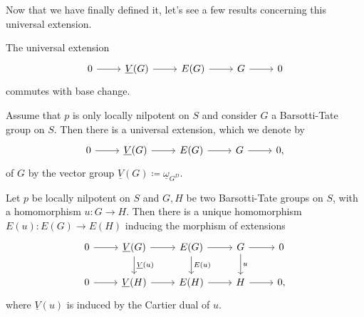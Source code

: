 \noindent
Now that we have finally defined it, let's see
a few results concerning this universal extension.


\begin{lem}
	The universal extension 
	\begin{equation*}
	\begin{tikzcd}
		0 \arrow[r, "", rightarrow] &
		\underline{V}(G) \arrow[r, "", rightarrow] &
		E(G) \arrow[r, "", rightarrow] &
		G \arrow[r, "", rightarrow] &
		0
	\end{tikzcd}
	\end{equation*}
	commutes with base change.
\end{lem} 


\begin{lem}
	Assume that $p$ is only locally nilpotent on $S$
	and consider $G$ a Barsotti-Tate group on $S$.
	Then there is a universal extension, which we denote by
	\begin{equation*}
	\begin{tikzcd}
		0 \arrow[r, "", rightarrow] &
		\underline{V}(G) \arrow[r, "", rightarrow] &
		E(G) \arrow[r, "", rightarrow] &
		G \arrow[r, "", rightarrow] &
		0
	,\end{tikzcd}
	\end{equation*}
	of $G$ by the vector group
	$\underline{V}(G) \coloneqq \underline{\omega}_{G^D}$.
\end{lem} 


\begin{prop}\label{prop:MorUnivExts}
	Let $p$ be locally nilpotent on $S$ and $G,H$ be two
	Barsotti-Tate groups on $S$, with a homomorphism $u\colon G \to H$.
	Then there is a unique homomorphism
	$E(u)\colon E(G) \to E(H)$ inducing the morphism of extensions
	\begin{equation*}
	\begin{tikzcd}
		0 \arrow[r, "", rightarrow] &
		\underline{V}(G) \arrow[r, "", rightarrow] 
		\arrow[d, "\underline{V}(u)", rightarrow] &
		E(G) \arrow[r, "", rightarrow] 
		\arrow[d, "E(u)", rightarrow] &
		G \arrow[r, "", rightarrow] 
		\arrow[d, "u", rightarrow] &
		0\\
		0 \arrow[r, "", rightarrow] &
		\underline{V}(H) \arrow[r, "", rightarrow] &
		E(H) \arrow[r, "", rightarrow] &
		H \arrow[r, "", rightarrow] &
		0
	,\end{tikzcd}
	\end{equation*}
	where $\underline{V}(u)$ is induced by the Cartier dual of $u$.
\end{prop} 


